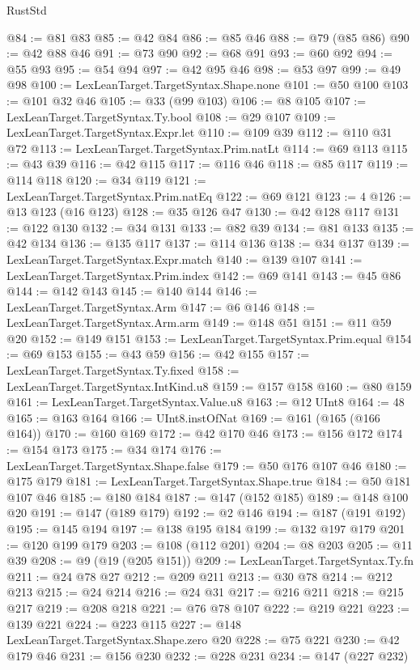 \begin{lexlean}{RustStd}
\begin{coremodule}
{\begin{coremodule}
{{{{{{{{{{{{{{@84 := @81 @83
@85 := @42 @84
@86 := @85 @46
@88 := @79 (@85 @86)
@90 := @42 @88 @46
@91 := @73 @90
@92 := @68 @91
@93 := @60 @92
@94 := @55 @93
@95 := @54 @94
@97 := @42 @95 @46
@98 := @53 @97
@99 := @49 @98
@100 := LexLeanTarget.TargetSyntax.Shape.none
@101 := @50 @100
@103 := @101 @32 @46
@105 := @33 (@99 @103)
@106 := @8 @105
@107 := LexLeanTarget.TargetSyntax.Ty.bool
@108 := @29 @107
@109 := LexLeanTarget.TargetSyntax.Expr.let
@110 := @109 @39
@112 := @110 @31 @72
@113 := LexLeanTarget.TargetSyntax.Prim.natLt
@114 := @69 @113
@115 := @43 @39
@116 := @42 @115
@117 := @116 @46
@118 := @85 @117
@119 := @114 @118
@120 := @34 @119
@121 := LexLeanTarget.TargetSyntax.Prim.natEq
@122 := @69 @121
@123 := 4
@126 := @13 @123 (@16 @123)
@128 := @35 @126 @47
@130 := @42 @128 @117
@131 := @122 @130
@132 := @34 @131
@133 := @82 @39
@134 := @81 @133
@135 := @42 @134
@136 := @135 @117
@137 := @114 @136
@138 := @34 @137
@139 := LexLeanTarget.TargetSyntax.Expr.match
@140 := @139 @107
@141 := LexLeanTarget.TargetSyntax.Prim.index
@142 := @69 @141
@143 := @45 @86
@144 := @142 @143
@145 := @140 @144
@146 := LexLeanTarget.TargetSyntax.Arm
@147 := @6 @146
@148 := LexLeanTarget.TargetSyntax.Arm.arm
@149 := @148 @51
@151 := @11 @59 @20
@152 := @149 @151
@153 := LexLeanTarget.TargetSyntax.Prim.equal
@154 := @69 @153
@155 := @43 @59
@156 := @42 @155
@157 := LexLeanTarget.TargetSyntax.Ty.fixed
@158 := LexLeanTarget.TargetSyntax.IntKind.u8
@159 := @157 @158
@160 := @80 @159
@161 := LexLeanTarget.TargetSyntax.Value.u8
@163 := @12 UInt8
@164 := 48
@165 := @163 @164
@166 := UInt8.instOfNat
@169 := @161 (@165 (@166 @164))
@170 := @160 @169
@172 := @42 @170 @46
@173 := @156 @172
@174 := @154 @173
@175 := @34 @174
@176 := LexLeanTarget.TargetSyntax.Shape.false
@179 := @50 @176 @107 @46
@180 := @175 @179
@181 := LexLeanTarget.TargetSyntax.Shape.true
@184 := @50 @181 @107 @46
@185 := @180 @184
@187 := @147 (@152 @185)
@189 := @148 @100 @20
@191 := @147 (@189 @179)
@192 := @2 @146
@194 := @187 (@191 @192)
@195 := @145 @194
@197 := @138 @195 @184
@199 := @132 @197 @179
@201 := @120 @199 @179
@203 := @108 (@112 @201)
@204 := @8 @203
@205 := @11 @39
@208 := @9 (@19 (@205 @151))
@209 := LexLeanTarget.TargetSyntax.Ty.fn
@211 := @24 @78 @27
@212 := @209 @211
@213 := @30 @78
@214 := @212 @213
@215 := @24 @214
@216 := @24 @31
@217 := @216 @211
@218 := @215 @217
@219 := @208 @218
@221 := @76 @78 @107
@222 := @219 @221
@223 := @139 @221
@224 := @223 @115
@227 := @148 LexLeanTarget.TargetSyntax.Shape.zero @20
@228 := @75 @221
@230 := @42 @179 @46
@231 := @156 @230
@232 := @228 @231
@234 := @147 (@227 @232)
}}}}}}}}}}}}}}
\end{coremodule}}
\end{coremodule}
\end{lexlean}
